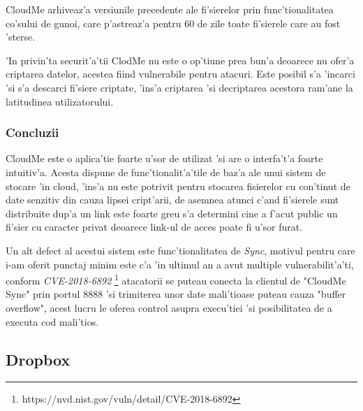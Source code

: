 \documentclass[12pt,a4paper,twoside]{report}
\begin{document}
CloudMe arhiveaz'a  versiunile precedente ale fi'sierelor  prin func'tionalitatea co'sului de gunoi, care p'astreaz'a pentru 60 de zile toate fi'sierele care au fost 'sterse.

'In privin'ta securit'a'tii ClodMe nu este o op'tiune prea bun'a deoarece nu ofer'a criptarea datelor, acestea fiind vulnerabile pentru atacuri. Este posibil s'a 'incarci 'si s'a descarci fi'siere criptate, 'ins'a criptarea 'si decriptarea acestora ram'ane la latitudinea utilizatorului.

\subsubsection{Concluzii}
CloudMe este o aplica'tie foarte u'sor de utilizat 'si are o interfa't'a foarte intuitiv'a. Acesta dispune de func'tionalit'a'tile de baz'a ale unui sistem de stocare 'in cloud, 'ins'a nu este potrivit pentru stocarea fisierelor cu con'tinut de date senzitiv din cauza lipsei cript'arii, de asemnea atunci c'and fi'sierele sunt distribuite dup'a un link este foarte greu s'a determini cine a f'acut public un fi'sier cu caracter privat deoarece link-ul de acces poate fi u'sor furat.

Un alt defect al acestui sistem este func'tionalitatea de {\it Sync}, motivul pentru care i-am oferit punctaj minim este c'a 'in ultimul an a avut multiple vulnerabilit'a'ti, conform {\it CVE-2018-6892} \footnote{https://nvd.nist.gov/vuln/detail/CVE-2018-6892} atacatorii se puteau conecta la clientul de  "CloudMe Sync" prin portul 8888 'si trimiterea unor date mali'tioase puteau cauza "buffer overflow", acest lucru le oferea control asupra execu'tiei 'si posibilitatea de a executa cod mali'tios.

\subsection{Dropbox} \label{dropbox}
\end{document}
